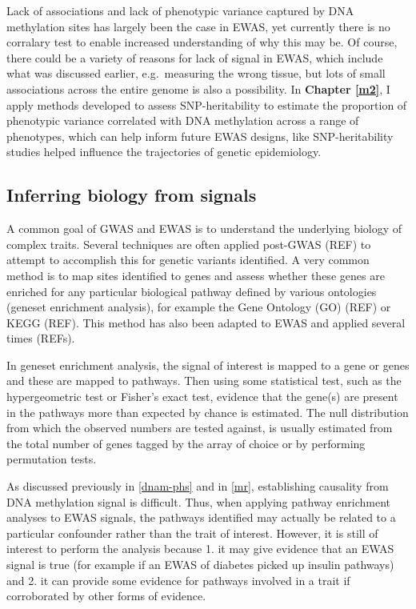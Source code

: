 \documentclass[11pt,twoside]{bristolthesis}
\begin{document}
Lack of associations and lack of phenotypic variance captured by DNA methylation sites has largely been the case in EWAS, yet currently there is no corralary test to enable increased understanding of why this may be. Of course, there could be a variety of reasons for lack of signal in EWAS, which include what was discussed earlier, e.g.~measuring the wrong tissue, but lots of small associations across the entire genome is also a possibility. In \textbf{Chapter \ref{m2}}, I apply methods developed to assess SNP-heritability to estimate the proportion of phenotypic variance correlated with DNA methylation across a range of phenotypes, which can help inform future EWAS designs, like SNP-heritability studies helped influence the trajectories of genetic epidemiology.

\hypertarget{inferring-biology-from-signals}{%
\subsection{Inferring biology from signals}\label{inferring-biology-from-signals}}

A common goal of GWAS and EWAS is to understand the underlying biology of complex traits. Several techniques are often applied post-GWAS (REF) to attempt to accomplish this for genetic variants identified. A very common method is to map sites identified to genes and assess whether these genes are enriched for any particular biological pathway defined by various ontologies (geneset enrichment analysis), for example the Gene Ontology (GO) (REF) or KEGG (REF). This method has also been adapted to EWAS and applied several times (REFs).

In geneset enrichment analysis, the signal of interest is mapped to a gene or genes and these are mapped to pathways. Then using some statistical test, such as the hypergeometric test or Fisher's exact test, evidence that the gene(s) are present in the pathways more than expected by chance is estimated. The null distribution from which the observed numbers are tested against, is usually estimated from the total number of genes tagged by the array of choice or by performing permutation tests.

As discussed previously in \ref{dnam-phs} and in \ref{mr}, establishing causality from DNA methylation signal is difficult. Thus, when applying pathway enrichment analyses to EWAS signals, the pathways identified may actually be related to a particular confounder rather than the trait of interest. However, it is still of interest to perform the analysis because 1. it may give evidence that an EWAS signal is true (for example if an EWAS of diabetes picked up insulin pathways) and 2. it can provide some evidence for pathways involved in a trait if corroborated by other forms of evidence.
\end{document}
